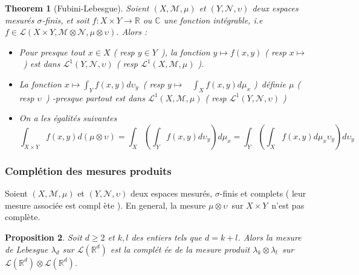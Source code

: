 \documentclass[3pt]{article}
\newtheorem{theorem}{Theorem}
\newtheorem{proposition}[theorem]{Proposition}
\begin{document}
\begin{theorem}[Fubini-Lebesgue]
Soient $(X,\mathcal{M},\mu )$ et $(Y,\mathcal{N},\upsilon )$ deux espaces
mesur\'{e}s $\sigma $-finis, et soit $f:X\times Y\rightarrow \mathbb{R}$ ou $%
\mathbb{C}$ une fonction int\'{e}grable, i.e $f\in \mathcal{L}(X\times Y,%
\mathcal{M}\otimes \mathcal{N},\mu \otimes \upsilon )$. Alors :

\begin{itemize}
\item Pour presque tout $x\in X$ ( resp $y\in Y$\ ), la fonction $y\mapsto
f(x,y)$ ( resp $x\mapsto $\ ) est dans $\mathcal{L}^{1}(Y,\mathcal{N}%
,\upsilon )$ ( resp $\mathcal{L}^{1}(X,\mathcal{M},\mu )$ ).

\item La fonction $x\mapsto \int_{Y}f(x,y)d\upsilon _{y}$\ ( resp $y\mapsto $%
\ $\int_{X}f(x,y)d\mu _{x}$ )\ d\'{e}finie $\mu $ ( resp $\upsilon $\ )
-presque partout est dans $\mathcal{L}^{1}(X,\mathcal{M},\mu )$ ( resp $%
\mathcal{L}^{1}(Y,\mathcal{N},\upsilon )$ )

\item On a les \'{e}galit\'{e}s suivantes 
\begin{equation*}
\int_{X\times Y}f(x,y)d(\mu \otimes \upsilon )=\int_{X}\left(
\int_{Y}f(x,y)d\upsilon _{y}\right) d\mu _{x}=\int_{Y}\left(
\int_{X}f(x,y)d\mu _{x}\upsilon _{y}\right) d\upsilon _{y}
\end{equation*}
\end{itemize}
\end{theorem}

\bigskip 

\subsubsection{Compl\'{e}tion des mesures produits}

Soient $(X,\mathcal{M},\mu )$ et $(Y,\mathcal{N},\upsilon )$ deux espaces
mesur\'{e}s, $\sigma $-finis et complets ( leur mesure associ\'{e}e est compl%
\`{e}te ). En general, la mesure $\mu \otimes \upsilon $\ sur $X\times Y$\
n'est pas compl\`{e}te.

\bigskip 

\begin{proposition}
Soit $d\geq 2$ et $k,l$ des entiers tels que $d=k+l$. Alors la mesure de
Lebesgue $\lambda _{d}$ sur $\mathcal{L}(\mathbb{R}^{d})$ est la compl\'{e}t%
\'{e}e de la mesure produit $\lambda _{k}\otimes \lambda _{l}$\ sur $%
\mathcal{L}(\mathbb{R}^{d})\otimes \mathcal{L}(\mathbb{R}^{d})$.
\end{proposition}
\end{document}
